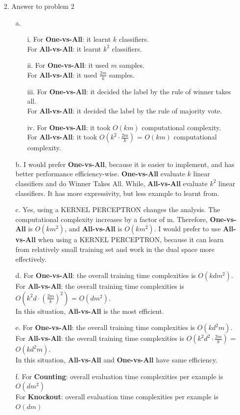 \begin{enumerate}
\pagebreak
\item[2.] Answer to problem 2
	\begin{enumerate}
	\item[a.]
		\begin{enumerate}
		\item[i.] For \textbf{One-vs-All}: it learnt $k$ classifiers. \\
					For \textbf{All-vs-All}: it learnt $k^2$ classifiers.
		\item[ii.] For \textbf{One-vs-All}: it used $m$ samples. \\
					For \textbf{All-vs-All}: it used $\frac{2m}{k}$ samples.
		\item[iii.] For \textbf{One-vs-All}: it decided the label by the rule of winner takes all. \\
					For \textbf{All-vs-All}: it decided the label by the rule of majority vote.
		\item[iv.] For \textbf{One-vs-All}: it took $O(km)$ computational complexity.\\
					For \textbf{All-vs-All}: it took $O(k^2 \cdot \frac{2m}{k})$ = $O(km)$ computational complexity.
		\end{enumerate}
	\item[b.] I would prefer \textbf{One-vs-All}, because it is easier to implement, and has better performance efficiency-wise. \textbf{One-vs-All} evaluate $k$ linear classifiers and do Winner Takes All. While, \textbf{All-vs-All} evaluate $k^2$ linear classifiers. It has more expressivity, but less example to learnt from.
	\item[c.] Yes, using a KERNEL PERCEPTRON changes the analysis. The computational complexity increases by a factor of m. Therefore, \textbf{One-vs-All} is $O(km^2)$, and \textbf{All-vs-All} is $O(km^2)$. I would prefer to use \textbf{All-vs-All} when using a KERNEL PERCEPTRON, because it can learn from relatively small training set and work in the dual space more effectively.
	\item[d.] For \textbf{One-vs-All}: the overall training time complexities is $O(kdm^2)$. \\
			For \textbf{All-vs-All}: the overall training time complexities is $O(k^2d \cdot (\frac{2m}{k})^2)$ = $O(dm^2)$.\\
			In this situation, \textbf{All-vs-All} is the most efficient.
	\item[e.] For \textbf{One-vs-All}: the overall training time complexities is $O(kd^2m)$. \\
			For \textbf{All-vs-All}: the overall training time complexities is $O(k^2d^2 \cdot \frac{2m}{k})$ = $O(kd^2m)$.\\
			In this situation, \textbf{All-vs-All} and \textbf{One-vs-All} have same efficiency.
	\item[f.] For \textbf{Counting}: overall evaluation time complexities per example is $O(dm^2)$\\
			For \textbf{Knockout}: overall evaluation time complexities per example is $O(dm)$\\
	\end{enumerate}


\end{enumerate}
